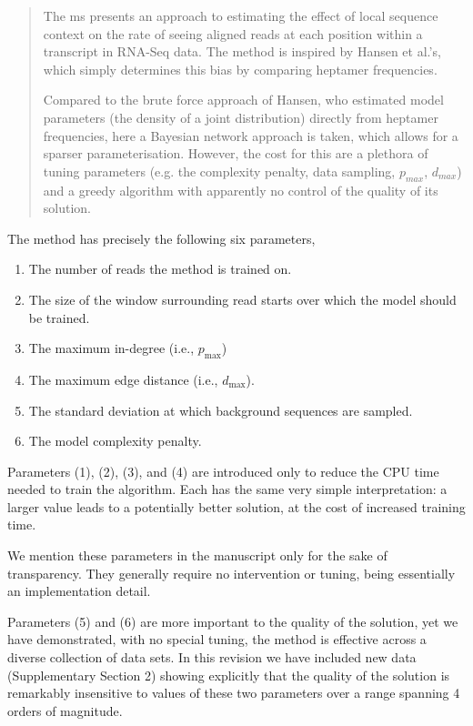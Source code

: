 \documentclass{article}
\begin{document}
\begin{quote}
The ms presents an approach to estimating the effect of local sequence
context on the rate of seeing aligned reads at each position within a
transcript in RNA-Seq data. The method is inspired by Hansen et al.'s,
which simply determines this bias by comparing heptamer frequencies.

Compared to the brute force approach of Hansen, who estimated model
parameters (the density of a joint distribution) directly from
heptamer frequencies, here a Bayesian network approach is taken, which
allows for a sparser parameterisation. However, the cost for this are
a plethora of tuning parameters (e.g. the complexity penalty, data
sampling, $p_{max}$, $d_{max}$) and a greedy algorithm with apparently no
control of the quality of its solution.
\end{quote}

The method has precisely the following six parameters,
\begin{enumerate}
\item The number of reads the method is trained on.
\item The size of the window surrounding read starts over which the model should
be trained.
\item The maximum in-degree (i.e., $p_{\text{max}}$)
\item The maximum edge distance (i.e., $d_{\text{max}}$).
\item The standard deviation at which background sequences are sampled.
\item The model complexity penalty.
\end{enumerate}

Parameters (1), (2), (3), and (4) are introduced only to reduce the CPU time
needed to train the algorithm. Each has the same very simple interpretation: a
larger value leads to a potentially better solution, at the cost of increased
training time. 

We mention these parameters in the manuscript only for the sake of transparency.
They generally require no intervention or tuning, being essentially an
implementation detail. 

Parameters (5) and (6) are more important to the quality of the solution, yet we
have demonstrated, with no special tuning, the method is effective across a
diverse collection of data sets. In this revision we have included new data
(Supplementary Section 2) showing explicitly that the quality of the solution is
remarkably insensitive to values of these two parameters over a range spanning 4
orders of magnitude. 
\end{document}

